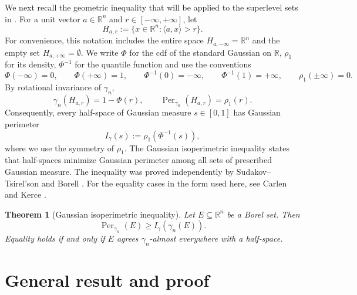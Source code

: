 \documentclass[11pt]{amsart}
\newtheorem{theorem}{Theorem}[section]
\theoremstyle{definition}
\newcommand{\R}{\mathbb{R}}
\newcommand{\Perg}{\operatorname{Per}_{\gamma_n}}
\begin{document}
We next recall the geometric inequality that will be applied to the
superlevel sets in . For a unit vector
$a\in\R^n$ and $r\in[-\infty,+\infty]$, let
\begin{equation}\label{eq:gaussian-halfspaces}
  H_{a,r}:=\{x\in\R^n:\langle a,x\rangle>r\}.
\end{equation}
For convenience, this notation includes the entire space $H_{a,-\infty}=\R^n$ and the empty set $H_{a,+\infty}=\emptyset$. We write $\Phi$ for the cdf of the standard Gaussian on $\R$, $\rho_1$ for its density, $\Phi^{-1}$ for the quantile function and use the conventions
\[
\Phi(-\infty)=0, 
\qquad
\Phi(+\infty)=1,
\qquad
  \Phi^{-1}(0)=-\infty,
  \qquad
  \Phi^{-1}(1)=+\infty,
  \qquad
  \rho_1(\pm\infty)=0.
\]
By rotational invariance of $\gamma_n$,
\[
  \gamma_n(H_{a,r})=1-\Phi(r),
  \qquad
  \Perg(H_{a,r})=\rho_1(r).
\]
Consequently, every half-space of Gaussian measure $s\in[0,1]$ has
Gaussian perimeter
\[
  I_\gamma(s):=\rho_1(\Phi^{-1}(s)),
\]
where we use the symmetry of $\rho_1$. The Gaussian isoperimetric
inequality states that half-spaces minimize Gaussian perimeter among
all sets of prescribed Gaussian measure. The inequality was proved independently by Sudakov--Tsirel'son \cite{SuTs78} and Borell \cite{Bo75}. For the equality cases in the form used
here, see Carlen and Kerce \cite[Theorem~2]{CaKe01}.

\begin{theorem}[Gaussian isoperimetric inequality]
\label{thm:gaussian-isoperimetry}
Let $E\subseteq\R^n$ be a Borel set. Then
\[
  \Perg(E)
  \geq
  I_\gamma(\gamma_n(E)).
\]
Equality holds if and only if $E$ agrees $\gamma_n$-almost everywhere
with a half-space.
\end{theorem}




\section{General result and proof}\label{sec:main}
\end{document}
